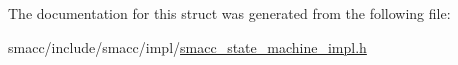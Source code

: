 The documentation for this struct was generated from the following file\+:\begin{DoxyCompactItemize}
\item 
smacc/include/smacc/impl/\hyperlink{smacc__state__machine__impl_8h}{smacc\+\_\+state\+\_\+machine\+\_\+impl.\+h}\end{DoxyCompactItemize}
